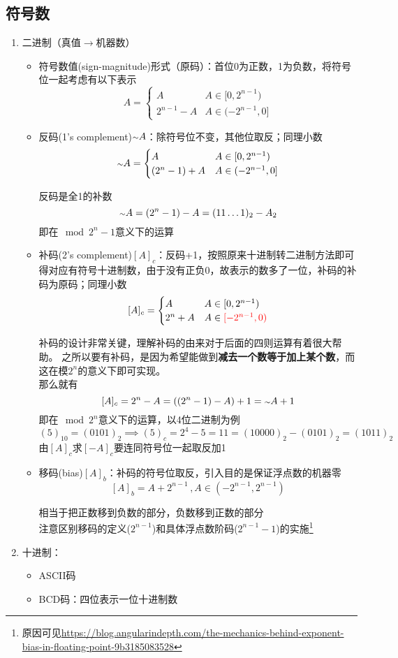 \subsection{符号数}
\begin{enumerate}
\item 二进制（真值$\to$机器数）
\begin{itemize}
	\item 符号数值(sign-magnitude)形式（原码）：首位0为正数，1为负数，将符号位一起考虑有以下表示
	\[A=\begin{cases}
	A & A\in[0,2^{n-1})\\
	2^{n-1}-A & A\in(-2^{n-1},0]
	\end{cases}\]
	\item 反码(1's complement)${\scriptstyle{\sim}} A$：除符号位不变，其他位取反；同理小数
	\[{\scriptstyle{\sim}} A=\begin{cases}
	A & A\in[0,2^{n-1})\\
	(2^n-1)+A & A\in (-2^{n-1},0]
	\end{cases}\]
	\begin{analysis}
	反码是全1的补数
	\[{\scriptstyle{\sim}} A=(2^n-1)-A=(11\ldots 1)_2-A_2\]
	即在$\mod 2^{n}-1$意义下的运算
	\end{analysis}
	\item 补码(2's complement)$[A]_c$：反码+1，按照原来十进制转二进制方法即可得对应有符号十进制数，由于没有正负0，故表示的数多了一位，补码的补码为原码；同理小数
	\[[A]_c=\begin{cases}
	A & A\in[0,2^{n-1})\\
	2^n+A & A\in \textcolor{red}{[-2^{n-1},0)}
	\end{cases}\]
	\begin{analysis}
	补码的设计非常关键，理解补码的由来对于后面的四则运算有着很大帮助。
	之所以要有补码，是因为希望能做到\textbf{减去一个数等于加上某个数}，而这在模$2^n$的意义下即可实现。\\
	那么就有
	\[[A]_c=2^n-A=((2^n-1)-A)+1={\scriptstyle{\sim}} A+1\]
	即在$\mod 2^n$意义下的运算，以4位二进制为例
	\[(5)_{10}=(0101)_2\implies (5)_c=2^4-5=11=(10000)_2-(0101)_2=(1011)_2\]
	由$[A]_c$求$[-A]_c$要连同符号位一起取反加1
	\end{analysis}
	\item 移码(bias)$[A]_b$：补码的符号位取反，引入目的是保证浮点数的机器零
	\[[A]_b=A+2^{n-1}\,,A\in(-2^{n-1},2^{n-1})\]
	\begin{analysis}
	相当于把正数移到负数的部分，负数移到正数的部分\\
	注意区别移码的定义($2^{n-1}$)和具体浮点数阶码($2^{n-1}-1$)的实施\footnote{原因可见\url{https://blog.angularindepth.com/the-mechanics-behind-exponent-bias-in-floating-point-9b3185083528}}
	\end{analysis}
\end{itemize}
\item 十进制：
\begin{itemize}
	\item ASCII码
	\item BCD码：四位表示一位十进制数
\end{itemize}
\end{enumerate}

